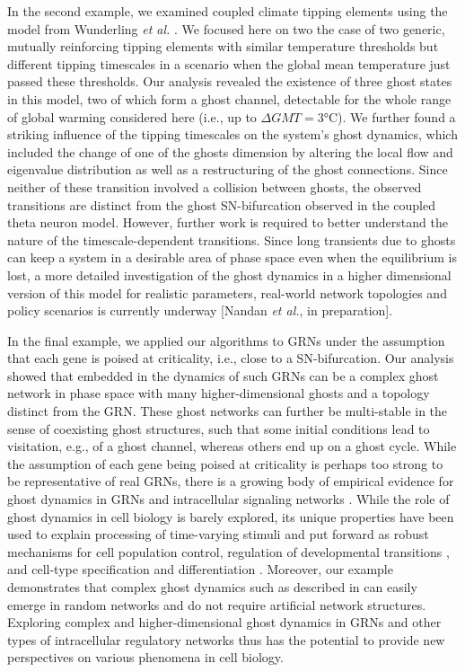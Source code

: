 \documentclass{article}
\theoremstyle{definition}
\begin{document}
\begin{refsection}
In the second example, we examined coupled climate tipping elements using the model from Wunderling \textit{et al.} \cite{Wunderling2021}. We focused here on two the case of two generic, mutually reinforcing tipping elements with similar temperature thresholds but different tipping timescales in a scenario when the global mean temperature just passed these thresholds. Our analysis revealed the existence of three ghost states in this model, two of which form a ghost channel, detectable for the whole range of global warming considered here (i.e., up to $\Delta GMT = 3$°C). We further found a striking influence of the tipping timescales on the system's ghost dynamics, which included the change of one of the ghosts dimension by altering the local flow and eigenvalue distribution as well as a restructuring of the ghost connections. Since neither of these transition involved a collision between ghosts, the observed transitions are distinct from the ghost SN-bifurcation observed in the coupled theta neuron model. However, further work is required to better understand the nature of the timescale-dependent transitions. Since long transients due to ghosts can keep a system in a desirable area of phase space even when the equilibrium is lost, a more detailed investigation of the ghost dynamics in a higher dimensional version of this model for realistic parameters, real-world network topologies and policy scenarios is currently underway [Nandan \textit{et al.}, in preparation].

In the final example, we applied our algorithms to GRNs under the assumption that each gene is poised at criticality, i.e., close to a SN-bifurcation. Our analysis showed that embedded in the dynamics of such GRNs can be a complex ghost network in phase space with many higher-dimensional ghosts and a topology distinct from the GRN. These ghost networks can further be multi-stable in the sense of coexisting ghost structures, such that some initial conditions lead to visitation, e.g., of a ghost channel, whereas others end up on a ghost cycle. While the assumption of each gene being poised at criticality is perhaps too strong to be representative of real GRNs, there is a growing body of empirical evidence for ghost dynamics in GRNs \cite{RodrguezMaroto2025,Mercadal2026} and intracellular signaling networks \cite{Stanoev2018}. While the role of ghost dynamics in cell biology is barely explored, its unique properties have been used to explain processing of time-varying stimuli\cite{Stanoev_2020,Koch2024_rev} and put forward as robust mechanisms for cell population control\cite{Simons2025}, regulation of developmental transitions \cite{RodrguezMaroto2025}, and cell-type specification and differentiation \cite{Mercadal2026,Farjami_2021}. Moreover, our example demonstrates that complex ghost dynamics such as described in \cite{Farjami_2021} can easily emerge in random networks and do not require artificial network structures. Exploring complex and higher-dimensional ghost dynamics in GRNs and other types of intracellular regulatory networks thus has the potential to provide new perspectives on various phenomena in cell biology.


\end{refsection}
\end{document}
